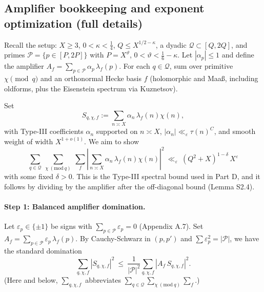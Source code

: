 \documentclass[11pt]{article}
\theoremstyle{definition}
\theoremstyle{remark}
\numberwithin{equation}{part}
\begin{document}
\subsection{Amplifier bookkeeping and exponent optimization (full details)}

Recall the setup: $X\ge 3$, $0<\kappa<\tfrac14$, $Q\le X^{1/2-\kappa}$, a dyadic $\mathcal Q\subset[Q,2Q]$,
and primes $\mathcal P=\{p\in[P,2P]\}$ with $P=X^\vartheta$, $0<\vartheta<\tfrac16-\kappa$.
Let $|\alpha_p|\le 1$ and define the amplifier $A_f=\sum_{p\in\mathcal P}\alpha_p\,\lambda_f(p)$.
For each $q\in\mathcal Q$, sum over primitive $\chi\pmod q$ and an orthonormal Hecke basis $f$
(holomorphic and Maaß, including oldforms, plus the Eisenstein spectrum via Kuznetsov).

Set
\[
	S_{q,\chi,f}:=\sum_{n\asymp X}\alpha_n\,\lambda_f(n)\chi(n),
\]
with Type-III coefficients $\alpha_n$ supported on $n\asymp X$,
$|\alpha_n|\ll_\varepsilon \tau(n)^C$, and smooth weight of width $X^{1+o(1)}$.
We aim to show
\begin{equation}\label{eq:TypeIIIgoal}
	\sum_{q\in\mathcal Q}\ \sum_{\chi\ (\mathrm{mod}\ q)}\ \sum_f
	\left|\sum_{n\asymp X}\alpha_n\,\lambda_f(n)\chi(n)\right|^2
	\ \ll_\varepsilon\ (Q^2+X)^{1-\delta}\,X^{\varepsilon}
\end{equation}
with some fixed $\delta>0$. This is the Type-III spectral bound used in Part D,
and it follows by dividing by the amplifier after the off-diagonal bound (Lemma S2.4).

\paragraph{Step 1: Balanced amplifier domination.}
Let $\varepsilon_p\in\{\pm 1\}$ be signs with $\sum_{p\in\mathcal P}\varepsilon_p=0$ (Appendix A.7).
Set $A_f=\sum_{p\in\mathcal P}\varepsilon_p\,\lambda_f(p)$.
By Cauchy-Schwarz in $(p,p')$ and $\sum\varepsilon_p^2=|\mathcal P|$, we have the standard domination
\begin{equation}\label{eq:amp-dom}
	\sum_{q,\chi,f}|S_{q,\chi,f}|^2
	\ \le\ \frac{1}{|\mathcal P|^2}\sum_{q,\chi,f}|A_f\,S_{q,\chi,f}|^2.
\end{equation}
(Here and below, $\sum_{q,\chi,f}$ abbreviates $\sum_{q\in\mathcal Q}\sum_{\chi\ (\mathrm{mod}\ q)}\sum_f$.)
\end{document}

